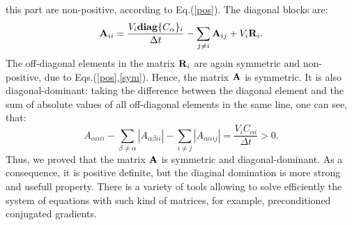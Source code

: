 this part are non-positive, according to Eq.(\ref{pos}). The diagonal blocks are:
\begin{equation}
{\bf A}_{ii} = \frac{V_i{\bf diag}\{C_\alpha\}_i}{\Delta t} -\sum_{j\ne i}{{\bf A}_{ij}} +V_i {\bf R}_i.
\end{equation}
The off-diagonal elements in the matrix ${\bf R}_i$ are again symmetric and non-positive, due to
Eqs.(\ref{pos},\ref{sym}). Hence, the matrix ${\bf A}$ is symmetric. It is also diagonal-dominant: 
taking the difference %
between the diagonal element and the sum of absolute values of all off-diagonal 
elements in the same line, one can see, that:
\begin{equation}
A_{\alpha\alpha ii}-\sum_{\beta\ne\alpha}{|A_{\alpha\beta ii}|}-\sum_{i\ne j}{|A_{\alpha\alpha ij}|}=\frac{V_iC_{\alpha i}}{\Delta t} >0.
\end{equation}
Thus, we proved that the matrix ${\bf A}$ is symmetric and diagonal-dominant. As a consequence,  it is positive definite, but the diaginal 
domination is more strong and usefull property. There is a variety of tools
allowing to solve efficiently the system of equations with such kind of matrices, for example, preconditioned conjugated gradients.

